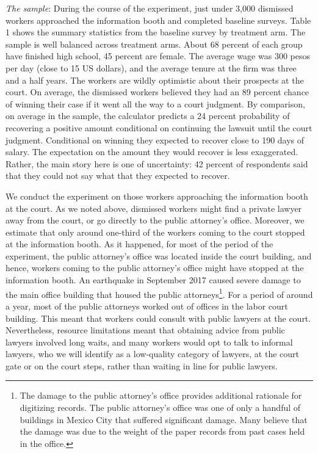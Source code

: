 \documentclass[12 pt]{article}
\begin{document}
\emph{The sample}: During the course of the experiment, just under 3,000 dismissed workers approached the information booth and completed baseline surveys. Table 1 shows the summary statistics from the baseline survey by treatment arm. The sample is well balanced across treatment arms. About 68 percent of each group have finished high school, 45 percent are female. The average wage was 300 pesos per day (close to 15 US dollars), and the average tenure at the firm was three and a half years. The workers are wildly optimistic about their prospects at the court. On average, the dismissed workers believed they had an 89 percent chance of winning their case if it went all the way to a court judgment. By comparison, on average in the sample, the calculator predicts a 24 percent probability of recovering a positive amount conditional on continuing the lawsuit until the court judgment. Conditional on winning they expected to recover close to 190 days of salary. The expectation on the amount they would recover is less exaggerated. Rather, the main story here is one of uncertainty: 42 percent of respondents said that they could not say what that they expected to recover. 

We conduct the experiment on those workers approaching the information booth at the court. As we noted above, dismissed workers might find a private lawyer away from the court, or go directly to the public attorney’s office. Moreover, we estimate that only around one-third of the workers coming to the court stopped at the information booth. As it happened, for most of the period of the experiment, the public attorney’s office was located inside the court building, and hence, workers coming to the public attorney’s office might have stopped at the information booth. An earthquake in September 2017 caused severe damage to the main office building that housed the public attorneys\footnote{The damage to the public attorney’s office provides additional rationale for digitizing records. The public attorney’s office was one of only a handful of buildings in Mexico City that suffered significant damage. Many believe that the damage was due to the weight of the paper records from past cases held in the office.}.  For a period of around a year, most of the public attorneys worked out of offices in the labor court building. This meant that workers could consult with public lawyers at the court. Nevertheless, resource limitations meant that obtaining advice from public lawyers involved long waits, and many workers would opt to talk to informal lawyers, who we will identify as a low-quality category of lawyers, at the court gate or on the court steps, rather than waiting in line for public lawyers.
\end{document}
